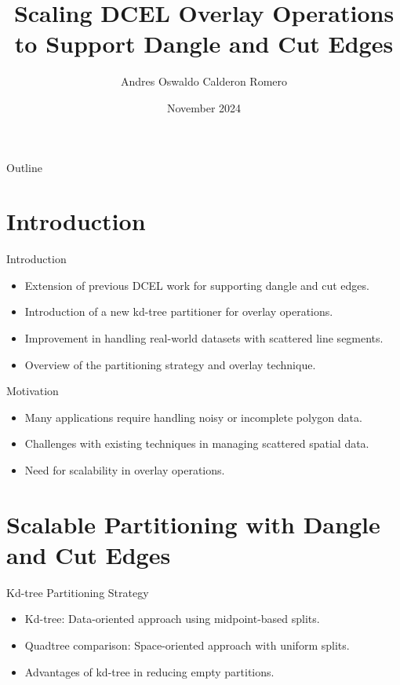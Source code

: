 \documentclass{beamer}
\title{Scaling DCEL Overlay Operations to Support Dangle and Cut Edges}
\author{Andres Oswaldo Calderon Romero}
\institute{University of California, Riverside}
\date{November 2024}
\begin{document}
\begin{frame}
    \titlepage
\end{frame}

\begin{frame}{Outline}
    \tableofcontents
\end{frame}

\section{Introduction}
\begin{frame}{Introduction}
    \begin{itemize}
        \item Extension of previous DCEL work for supporting dangle and cut edges.
        \item Introduction of a new kd-tree partitioner for overlay operations.
        \item Improvement in handling real-world datasets with scattered line segments.
        \item Overview of the partitioning strategy and overlay technique.
    \end{itemize}
\end{frame}

\begin{frame}{Motivation}
    \begin{itemize}
        \item Many applications require handling noisy or incomplete polygon data.
        \item Challenges with existing techniques in managing scattered spatial data.
        \item Need for scalability in overlay operations.
    \end{itemize}
\end{frame}

\section{Scalable Partitioning with Dangle and Cut Edges}
\begin{frame}{Kd-tree Partitioning Strategy}
    \begin{itemize}
        \item Kd-tree: Data-oriented approach using midpoint-based splits.
        \item Quadtree comparison: Space-oriented approach with uniform splits.
        \item Advantages of kd-tree in reducing empty partitions.
    \end{itemize}
\end{frame}
\end{document}
